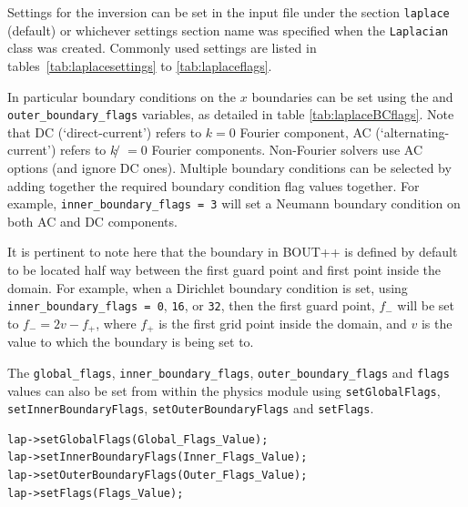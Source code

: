 \documentclass[12pt]{article}
\newcommand{\code}[1]{\texttt{#1}}
\begin{document}
Settings for the inversion can be set in the input file under the section \code{laplace} (default) or whichever settings section name was specified when the \lstinline!Laplacian! class was created.  Commonly used settings are listed in tables~\ref{tab:laplacesettings} to \ref{tab:laplaceflags}.

In particular boundary conditions on the $x$ boundaries can be set using the  and \code{outer\_boundary\_flags} variables, as detailed in table \ref{tab:laplaceBCflags}.  Note that DC (`direct-current') refers to $k = 0$ Fourier component, AC (`alternating-current') refers to $k ̸= 0$ Fourier components.  Non-Fourier solvers use AC options (and ignore DC ones).  Multiple boundary conditions can be selected by adding together the required boundary condition flag values together.  For example, \lstinline!inner_boundary_flags = 3! will set a Neumann boundary condition on both AC and DC components.

It is pertinent to note here that the boundary in BOUT++ is defined by default to be located half way between the first guard point and first point inside the domain.  For example, when a Dirichlet boundary condition is set, using \lstinline!inner_boundary_flags = 0!, \code{16}, or \code{32}, then the first guard point, $f_{-}$ will be set to $f_{-} = 2v - f_+$, where $f_+$ is the first grid point inside the domain, and $v$ is the value to which the boundary is being set to.

The \code{global\_flags}, \code{inner\_boundary\_flags},  \code{outer\_boundary\_flags} and \code{flags} values can also be set from within the physics module using \lstinline!setGlobalFlags!,  \lstinline!setInnerBoundaryFlags!,  \lstinline!setOuterBoundaryFlags! and  \lstinline!setFlags!.
\begin{lstlisting}
lap->setGlobalFlags(Global_Flags_Value);
lap->setInnerBoundaryFlags(Inner_Flags_Value);
lap->setOuterBoundaryFlags(Outer_Flags_Value);
lap->setFlags(Flags_Value);
\end{lstlisting}
\end{document}
